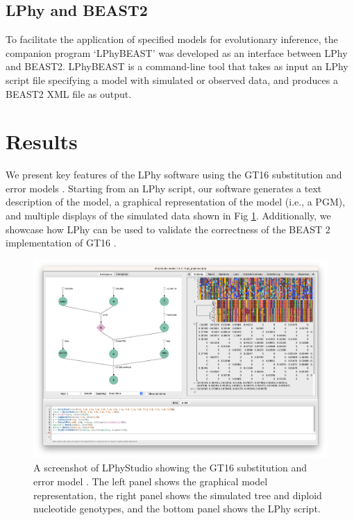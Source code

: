 \documentclass[10pt,letterpaper,table]{article}
\theoremstyle{definition}
\begin{document}
\subsection{LPhy and BEAST2}
\label{sec:lphybeast}
To facilitate the application of specified models for evolutionary inference, the companion program `LPhyBEAST' was developed as an interface between LPhy and BEAST2.
LPhyBEAST is a command-line tool that takes as input an LPhy script file specifying a model with simulated or observed data, and produces a BEAST2 XML file as output.

\section{Results}
We present key features of the LPhy software using the GT16 substitution and error models \cite{kozlov2022cellphy}. 
Starting from an LPhy script, our software generates a text description of the model, a graphical representation of the model (i.e., a PGM), and multiple displays of the simulated data shown in Fig \ref{fig:phylonco_lphystudio}. 
Additionally, we showcase how LPhy can be used to validate the correctness of the BEAST 2 implementation of GT16 \cite{chen2022accounting}.  

\begin{figure}[!ht]
    \centering
    \includegraphics[width=\textwidth]{figs_plos/Fig3.png }
    \caption{A screenshot of LPhyStudio showing the GT16 substitution and error model \cite{kozlov2022cellphy, chen2022accounting}. 
    The left panel shows the graphical model representation, the right panel shows the simulated tree and diploid nucleotide genotypes, and the bottom panel shows the LPhy script. }
    \label{fig:phylonco_lphystudio}
\end{figure}
\end{document}
